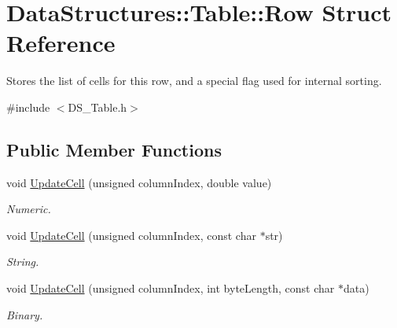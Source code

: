\hypertarget{struct_data_structures_1_1_table_1_1_row}{\section{Data\-Structures\-:\-:Table\-:\-:Row Struct Reference}
\label{struct_data_structures_1_1_table_1_1_row}
}


Stores the list of cells for this row, and a special flag used for internal sorting.  




{\ttfamily \#include $<$D\-S\-\_\-\-Table.\-h$>$}

\subsection*{Public Member Functions}
\begin{DoxyCompactItemize}
\item 
\hypertarget{struct_data_structures_1_1_table_1_1_row_a33a7a034ee2177240fd77db91eb24969}{void \hyperlink{struct_data_structures_1_1_table_1_1_row_a33a7a034ee2177240fd77db91eb24969}{Update\-Cell} (unsigned column\-Index, double value)}\label{struct_data_structures_1_1_table_1_1_row_a33a7a034ee2177240fd77db91eb24969}

\begin{DoxyCompactList}\small\item\em Numeric. \end{DoxyCompactList}\item 
\hypertarget{struct_data_structures_1_1_table_1_1_row_a0f6712d136d78afde959c606d72cba17}{void \hyperlink{struct_data_structures_1_1_table_1_1_row_a0f6712d136d78afde959c606d72cba17}{Update\-Cell} (unsigned column\-Index, const char $\ast$str)}\label{struct_data_structures_1_1_table_1_1_row_a0f6712d136d78afde959c606d72cba17}

\begin{DoxyCompactList}\small\item\em String. \end{DoxyCompactList}\item 
\hypertarget{struct_data_structures_1_1_table_1_1_row_a3e3ac8f4732ef5d9a7b267e852a85530}{void \hyperlink{struct_data_structures_1_1_table_1_1_row_a3e3ac8f4732ef5d9a7b267e852a85530}{Update\-Cell} (unsigned column\-Index, int byte\-Length, const char $\ast$data)}\label{struct_data_structures_1_1_table_1_1_row_a3e3ac8f4732ef5d9a7b267e852a85530}

\begin{DoxyCompactList}\small\item\em Binary. \end{DoxyCompactList}\end{DoxyCompactItemize}
